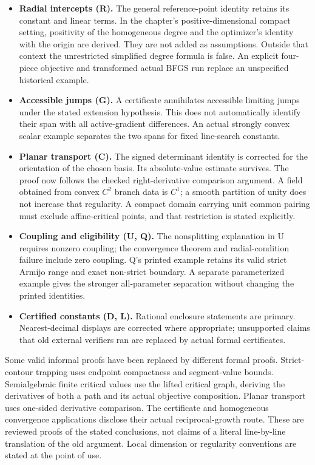 \documentclass[10pt,oneside,openany]{book}
\theoremstyle{remark}\newtheorem{remark}{Remark}[chapter]
\begin{document}
\begin{itemize}
\item \textbf{Radial intercepts (R).} The general reference-point identity retains its constant and linear terms. In the chapter's positive-dimensional compact setting, positivity of the homogeneous degree and the optimizer's identity with the origin are derived. They are not added as assumptions. Outside that context the unrestricted simplified degree formula is false. An explicit four-piece objective and transformed actual BFGS run replace an unspecified historical example.
\item \textbf{Accessible jumps (G).} A certificate annihilates accessible limiting jumps under the stated extension hypothesis. This does not automatically identify their span with all active-gradient differences. An actual strongly convex scalar example separates the two spans for fixed line-search constants.
\item \textbf{Planar transport (C).} The signed determinant identity is corrected for the orientation of the chosen basis. Its absolute-value estimate survives. The proof now follows the checked right-derivative comparison argument. A field obtained from convex $C^2$ branch data is $C^1$; a smooth partition of unity does not increase that regularity. A compact domain carrying unit common pairing must exclude affine-critical points, and that restriction is stated explicitly.
\item \textbf{Coupling and eligibility (U, Q).} The nonsplitting explanation in U requires nonzero coupling; the convergence theorem and radial-condition failure include zero coupling. Q's printed example retains its valid strict Armijo range and exact non-strict boundary. A separate parameterized example gives the stronger all-parameter separation without changing the printed identities.
\item \textbf{Certified constants (D, L).} Rational enclosure statements are primary. Nearest-decimal displays are corrected where appropriate; unsupported claims that old external verifiers ran are replaced by actual formal certificates.
\end{itemize}

Some valid informal proofs have been replaced by different formal proofs. Strict-contour trapping uses endpoint compactness and segment-value bounds. Semialgebraic finite critical values use the lifted critical graph, deriving the derivatives of both a path and its actual objective composition. Planar transport uses one-sided derivative comparison. The certificate and homogeneous convergence applications disclose their actual reciprocal-growth route. These are reviewed proofs of the stated conclusions, not claims of a literal line-by-line translation of the old argument. Local dimension or regularity conventions are stated at the point of use.
\end{document}
